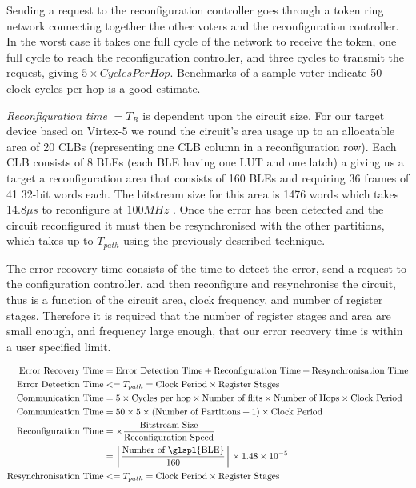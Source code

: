 \documentclass[12pt,final,oneside]{dwThesis} %
\begin{document}
   Sending a request to the reconfiguration controller goes through a token
   ring network connecting together the other voters and the reconfiguration
   controller. In the worst case it takes one full cycle of the network to
   receive the token, one full cycle to reach the reconfiguration controller,
   and three cycles to transmit the request, giving $5\times Cycles Per Hop$.
   Benchmarks of a sample voter indicate 50 clock cycles per hop is a good
   estimate.

   \textit{Reconfiguration time} $= T_R$ is dependent upon the circuit size.
   For our target device based on Virtex-5 we round the circuit's area usage up
   to an allocatable area of 20 \glspl{CLB} (representing one \gls{CLB} column
   in a reconfiguration row). Each \gls{CLB} consists of 8 \glspl{BLE} (each
   \gls{BLE} having one \gls{LUT} and one latch) a giving us a target a
   reconfiguration area that consists of 160 \glspl{BLE} and requiring 36
   frames of 41 32-bit words each. The bitstream size for this area is 1476
   words which takes 14.8$\mu{}s$ to reconfigure at $100MHz$
   \cite{XilinxConfigurationUG}.  Once the error has been detected and the
   circuit reconfigured it must then be resynchronised with the other
   partitions, which takes up to $T_{path}$ using the previously described
   technique.

   The error recovery time consists of the time to detect the error, send a
   request to the configuration controller, and then reconfigure and
   resynchronise the circuit, thus is a function of the circuit area, clock
   frequency, and number of register stages. Therefore it is required that the
   number of register stages and area are small enough, and frequency large
   enough, that our error recovery time is within a user specified limit.

   \begin{align}
      \mbox{Error Recovery Time} &=\mbox{Error Detection Time} +
      \mbox{Reconfiguration Time} + \mbox{Resynchronisation Time}\notag\\
      \mbox{Error Detection Time} &<= T_{path} = \mbox{Clock
         Period}\times\mbox{Register Stages}\notag\\
      \mbox{Communication Time}
      &= 5\times \mbox{Cycles per hop}\times\mbox{Number of
         flits}\times\mbox{Number of Hops}\times \mbox{Clock Period}\notag\\
      \mbox{Communication Time} &= 50\times 5\times (\mbox{Number of
         Partitions}+1)\times \mbox{Clock Period}\notag\\
      \mbox{Reconfiguration
         Time} &= \times \frac{\mbox{Bitstream
            Size}}{\mbox{Reconfiguration Speed}}\notag\\
      &=\left\lceil \frac{\mbox{Number of
            \glspl{BLE}}}{160}\right\rceil\times 1.48\times10^{-5}\notag\\
      \mbox{Resynchronisation Time} &<= T_{path} = \mbox{Clock
         Period}\times\mbox{Register Stages}\notag\\
   \end{align}
   
\end{document}
